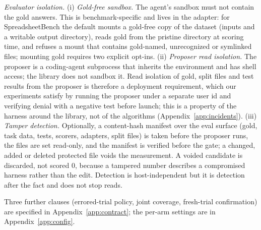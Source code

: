 \emph{Evaluator isolation.}
(i) \emph{Gold-free sandbox.} The agent's sandbox must not contain the gold answers. This is benchmark-specific and
lives in the adapter: for SpreadsheetBench the default mounts a gold-free copy of the dataset (inputs and a writable
output directory), reads gold from the pristine directory at scoring time, and refuses a mount that contains
gold-named, unrecognized or symlinked files; mounting gold requires two explicit opt-ins.
(ii) \emph{Proposer read isolation.} The proposer is a coding-agent subprocess that inherits the environment and has
shell access; the library does not sandbox it. Read isolation of gold, split files and test results from the proposer is
therefore a deployment requirement, which our experiments satisfy by running the proposer under a separate user id and
verifying denial with a negative test before launch; this is a property of the harness around the library, not of the
algorithms (Appendix~\ref{app:incidents}).
(iii) \emph{Tamper detection.} Optionally, a content-hash manifest over the eval surface (gold, task data, tests,
scorers, adapters, split files) is taken before the proposer runs, the files are set read-only, and the manifest is
verified before the gate; a changed, added or deleted protected file voids the measurement. A voided candidate is
discarded, not scored $0$, because a tampered number describes a compromised harness rather than the edit.
Detection is host-independent but it is detection after the fact and does not stop reads.

Three further clauses (errored-trial policy, joint coverage, fresh-trial confirmation) are specified in Appendix~\ref{app:contract}; the per-arm settings are in Appendix~\ref{app:config}.

